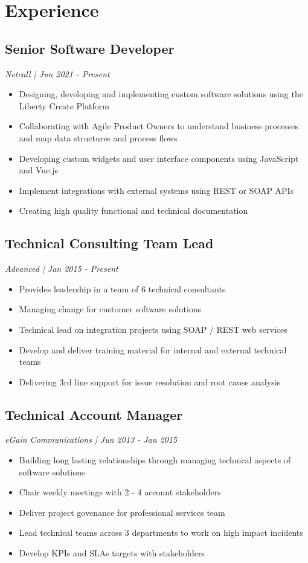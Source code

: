 %
%
\section{Experience}
%
%
\subsection{Senior Software Developer}
\textit{ Netcall | Jun 2021 - Present }
\begin{itemize}
\vspace{6pt}
	\item Designing, developing and implementing custom software solutions using the Liberty Create Platform
	\item Collaborating with Agile Product Owners to understand business processes and map data structures and process flows
	\item Developing custom widgets and user interface components using JavaScript and Vue.js
	\item Implement integrations with external systems using REST or SOAP APIs
	\item Creating high quality functional and technical documentation
\end{itemize}

%
%
\subsection{Technical Consulting Team Lead}
\textit{ Advanced | Jan 2015 - Present }
\begin{itemize}
\vspace{6pt}
	\item Provides leadership in a team of 6 technical consultants
	\item Managing change for customer software solutions
	\item Technical lead on integration projects using SOAP / REST web services
	\item Develop and deliver training material for internal and external technical teams
	\item Delivering 3rd line support for issue resolution and root cause analysis
\end{itemize}

%
%
\subsection{Technical Account Manager}
\textit{ eGain Communications | Jun 2013 - Jan 2015 }
\begin{itemize}
	\item Building long lasting relationships through managing technical aspects of software solutions
	\item Chair weekly meetings with 2 - 4 account stakeholders
	\item Deliver project govenance for professional services team
	\item Lead technical teams across 3 departments to work on high impact incidents
	\item Develop KPIs and SLAs targets with stakeholders
\end{itemize}

